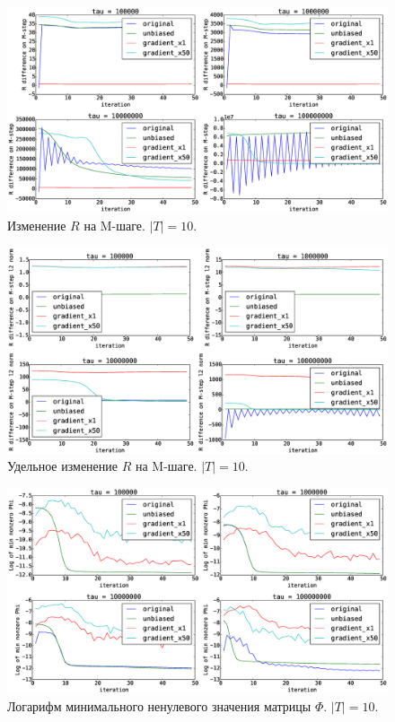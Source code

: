 \documentclass[utf8]{beamer}
\begin{document}
\begin{frame}
\begin{figure}[h]
	\centering
	\caption{Изменение $R$ на M-шаге. $|T| = 10$.}    
	\includegraphics[width=1.0\linewidth]{presentation_pictures/topics_10_RMstepDiff}
\end{figure}
\end{frame}
	
\begin{frame}
\begin{figure}[h]
	\centering
	\caption{Удельное изменение $R$ на M-шаге. $|T| = 10$.}    
	\includegraphics[width=1.0\linewidth]{presentation_pictures/topics_10_RMstepDiffPerL2}
\end{figure}
\end{frame}
	
\begin{frame}
\begin{figure}[h]
	\centering
	\caption{Логарифм минимального ненулевого значения матрицы $\Phi$. $|T| = 10$.}    
	\includegraphics[width=1.0\linewidth]{presentation_pictures/topics_10_minPhi_values}
\end{figure}
\end{frame}
	
\end{document}
